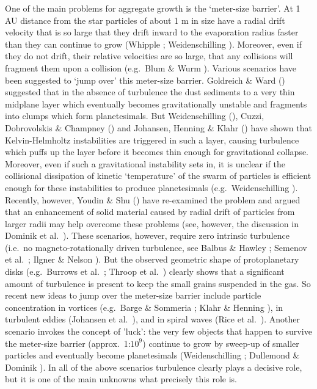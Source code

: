 One of the main problems for aggregate growth is the `meter-size
barrier'. At 1 AU distance from the star particles of about 1 m in size have
a radial drift velocity that is so large that they drift inward to the
evaporation radius faster than they can continue to grow (Whipple
; Weidenschilling ). Moreover, even if they do not
drift, their relative velocities are so large, that any collisions will
fragment them upon a collision (e.g.~Blum \& Wurm ). Various
scenarios have been suggested to `jump over' this meter-size
barrier. Goldreich \& Ward () suggested that in the absence of
turbulence the dust sediments to a very thin midplane layer which eventually
becomes gravitationally unstable and fragments into clumps which form
planetesimals. But Weidenschilling (), Cuzzi, Dobrovolskis \&
Champney () and Johansen, Henning \& Klahr () have shown
that Kelvin-Helmholtz instabilities are triggered in such a layer, causing
turbulence which puffs up the layer before it becomes thin enough for
gravitational collapse. Moreover, even if such a gravitational instability
sets in, it is unclear if the collisional dissipation of kinetic
`temperature' of the swarm of particles is efficient enough for these
instabilities to produce planetesimals (e.g.~Weidenschilling
). Recently, however, Youdin \& Shu () have re-examined
the problem and argued that an enhancement of solid material caused by
radial drift of particles from larger radii may help overcome these problems
(see, however, the discussion in Dominik et al.~). These
scenarios, however, require zero intrinsic turbulence (i.e.~no
magneto-rotationally driven turbulence, see Balbus \& Hawley
; Semenov et al.~; Ilgner \& Nelson
). But the observed geometric shape of protoplanetary disks
(e.g.~Burrows et al.~; Throop et al.~) clearly shows
that a significant amount of turbulence is present to keep the small grains
suspended in the gas. So recent new ideas to jump over the meter-size
barrier include particle concentration in vortices (e.g.~Barge \& Sommeria
; Klahr \& Henning ), in turbulent eddies (Johansen et
al.~), and in spiral waves (Rice et al.\ ).  Another
scenario invokes the concept of 'luck': the very few objects that happen to
survive the meter-size barrier (approx.\ 1:$10^9$) continue to grow by
sweep-up of smaller particles and eventually become planetesimals
(Weidenschilling ; Dullemond \& Dominik ). In all of the
above scenarios turbulence clearly plays a decisive role, but it is one of
the main unknowns what precisely this role is.

